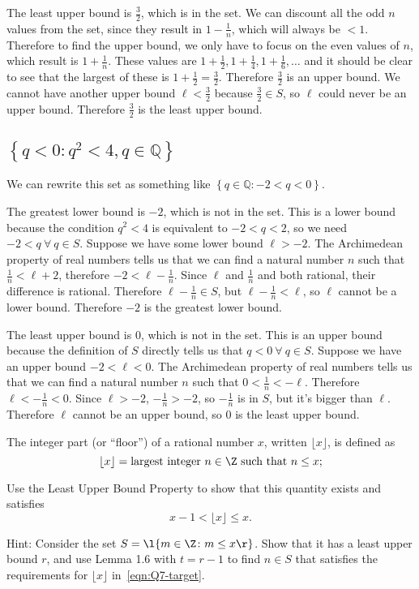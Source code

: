 \documentclass[a4paper]{article}
\begin{document}
The least upper bound is $\frac32$, which is in the set. We can discount all the odd $n$ values from the set, since they result in $1 - \frac1n$, which will always be $< 1$. Therefore to find the upper bound, we only have to focus on the even values of $n$, which result is $1 + \frac1n$. These values are $1 + \frac12, 1 + \frac14, 1 + \frac16, \ldots$ and it should be clear to see that the largest of these is $1 + \frac12 = \frac32$. Therefore $\frac32$ is an upper bound. We cannot have another upper bound $\ell < \frac32$ because $\frac32 \in S$, so $\ell$ could never be an upper bound. Therefore $\frac32$ is the least upper bound.

\subsection{$\left\{ q < 0 : q^2 < 4, q \in \mathbb{Q} \right\}$}

We can rewrite this set as something like $\left\{ q \in \mathbb Q : -2 < q < 0 \right\}$.

The greatest lower bound is $-2$, which is not in the set. This is a lower bound because the condition $q^2 < 4$ is equivalent to $-2 < q < 2$, so we need $-2 < q\ \forall\ q \in S$. Suppose we have some lower bound $\ell > -2$. The Archimedean property of real numbers tells us that we can find a natural number $n$ such that $\frac1n < \ell + 2$, therefore $-2 < \ell - \frac1n$. Since $\ell$ and $\frac1n$ and both rational, their difference is rational. Therefore $\ell - \frac1n \in S$, but $\ell - \frac1n < \ell$, so $\ell$ cannot be a lower bound. Therefore $-2$ is the greatest lower bound.

The least upper bound is $0$, which is not in the set. This is an upper bound because the definition of $S$ directly tells us that $q < 0\ \forall\ q \in S$. Suppose we have an upper bound $-2 < \ell < 0$. The Archimedean property of real numbers tells us that we can find a natural number $n$ such that $0 < \frac1n < -\ell$. Therefore $\ell < -\frac1n < 0$. Since $\ell > -2$, $-\frac1n > -2$, so $-\frac1n$ is in $S$, but it's bigger than $\ell$. Therefore $\ell$ cannot be an upper bound, so $0$ is the least upper bound.


\begin{questionbody}
The integer part (or \enquote{floor}) of a rational number $x$, written $\lfloor x \rfloor$, is defined as \[
\lfloor x \rfloor = \text{largest integer } n \in \Z \text{ such that } n \le x;
\]

Use the Least Upper Bound Property to show that this quantity exists and satisfies \begin{equation}
x - 1 < \lfloor x \rfloor \le x.
\label{eqn:Q7-target}
\end{equation}

Hint: Consider the set $S = \l\{ m \in \Z \colon m \le x \r\}$. Show that it has a least upper bound $r$,
and use Lemma 1.6 with $t = r − 1$ to find $n \in S$ that satisfies the requirements for $\lfloor x \rfloor$ in~\eqref{eqn:Q7-target}.
\end{questionbody}
\end{document}
